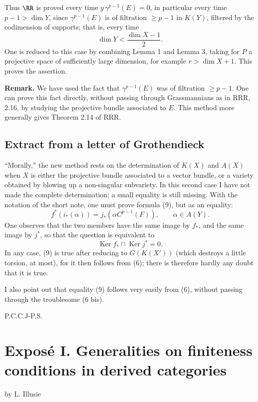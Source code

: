 \documentclass[11pt]{article}
\newcommand{\RRR}{\mathrm{RRR}}
\providecommand{\Ker}{\operatorname{Ker}}
\begin{document}
Thus \(\RR\) is proved every time \(y\,\gamma^{p-1}(E)=0\), in particular every time \(p-1>\dim Y\), since \(\gamma^{p-1}(E)\) is of filtration \(\geq p-1\) in \(K(Y)\), filtered by the codimension of supports; that is, every time
\[
  \dim Y < \frac{\dim X-1}{2}.
\]
One is reduced to this case by combining Lemma 1 and Lemma 3, taking for \(P\) a projective space of sufficiently large dimension, for example \(r>\dim X+1\). This proves the assertion.

\textbf{Remark.} We have used the fact that \(\gamma^{p-1}(E)\) was of filtration \(\geq p-1\). One can prove this fact directly, without passing through Grassmannians as in \(\RRR\), 2.16, by studying the projective bundle associated to \(E\). This method more generally gives Theorem 2.14 of \(\RRR\).

\subsection*{Extract from a letter of Grothendieck}
``Morally,'' the new method rests on the determination of \(K(X)\) and \(A(X)\) when \(X\) is either the projective bundle associated to a vector bundle, or a variety obtained by blowing up a non-singular subvariety. In this second case I have not made the complete determination; a small equality is still missing. With the notation of the short note, one must prove formula (9), but as an equality:
\begin{equation}\tag{9}
  f^*(i_*(\alpha))=j_*(\alpha C^{p-1}(F)),\qquad \alpha\in A(Y).
\end{equation}
One observes that the two members have the same image by \(f_*\), and the same image by \(j^*\), so that the question is equivalent to
\begin{equation}\tag{9 bis}
  \Ker f_*\cap\Ker j^*=0.
\end{equation}
In any case, (9) is true after reducing to \(G(K(X'))\) (which destroys a little torsion, at most), for it then follows from (6); there is therefore hardly any doubt that it is true.

I also point out that equality (9) follows very easily from (6), without passing through the troublesome (6 bis).

\begin{flushleft}
P.C.C.J-P.S.
\end{flushleft}

\newpage
\section*{Exposé I. Generalities on finiteness conditions in derived categories}
\begin{center}
by L. Illusie
\end{center}
\end{document}
